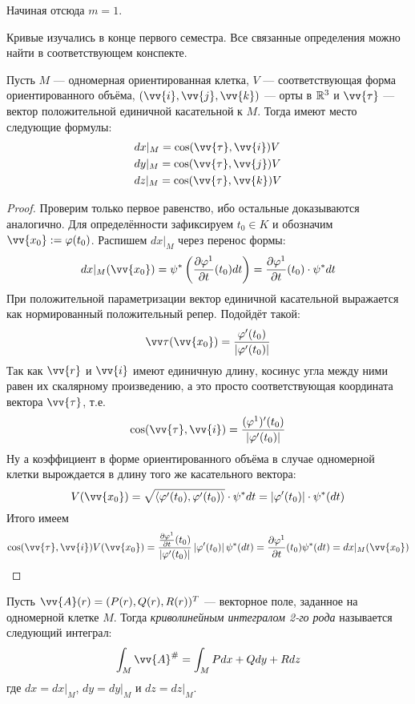\begin{note}
	Начиная отсюда $m = 1$.
\end{note}

\begin{reminder}
	Кривые изучались в конце первого семестра. Все связанные определения можно найти в соответствующем конспекте.
\end{reminder}

\begin{proposition}
	Пусть $M$ --- одномерная ориентированная клетка, $V$ --- соответствующая форма ориентированного объёма, $(\vv{i}, \vv{j}, \vv{k})$ --- орты в $\mathbb{R}^3$ и $\vv{\tau}$ --- вектор положительной единичной касательной к $M$. Тогда имеют место следующие формулы:
	\begin{align*}
		&{dx|_M = \cos(\vv{\tau}, \vv{i})V}
		\\
		&{dy|_M = \cos(\vv{\tau}, \vv{j})V}
		\\
		&{dz|_M = \cos(\vv{\tau}, \vv{k})V}
	\end{align*}
\end{proposition}

\begin{proof}
	Проверим только первое равенство, ибо остальные доказываются аналогично. Для определённости зафиксируем $t_0 \in K$ и обозначим $\vv{x_0} := \phi(t_0)$. Распишем $dx|_M$ через перенос формы:
	\[
		dx|_M(\vv{x_0}) = \psi^* \ps{\pd{\phi^1}{t}(t_0)dt} = \pd{\phi^1}{t}(t_0) \cdot \psi^*dt
	\]
	При положительной параметризации вектор единичной касательной выражается как нормированный положительный репер. Подойдёт такой:
	\[
		\vv\tau(\vv{x_0}) = \frac{\phi'(t_0)}{\md{\phi'(t_0)}}
	\]
	Так как $\vv{r}$ и $\vv{i}$ имеют единичную длину, косинус угла между ними равен их скалярному произведению, а это просто соответствующая координата вектора $\vv{\tau}$, т.е.
	\[
		\cos(\vv{\tau}, \vv{i}) = \frac{(\phi^1)'(t_0)}{\md{\phi'(t_0)}}
	\]
	Ну а коэффициент в форме ориентированного объёма в случае одномерной клетки вырождается в длину того же касательного вектора:
	\[
		V(\vv{x_0}) = \sqrt{\tbr{\phi'(t_0), \phi'(t_0)}} \cdot \psi^*dt = \md{\phi'(t_0)} \cdot \psi^*(dt)
	\]
	Итого имеем
	\[
		\cos(\vv{\tau}, \vv{i})V(\vv{x_0}) = \frac{\pd{\phi^1}{t}(t_0)}{\md{\phi'(t_0)}} \md{\phi'(t_0)} \psi^*(dt) = \pd{\phi^1}{t}(t_0) \psi^*(dt) = dx|_M(\vv{x_0})
	\]
\end{proof}

\begin{definition}
	Пусть $\vv{A}(r) = (P(r), Q(r), R(r))^T$ --- векторное поле, заданное на одномерной клетке $M$. Тогда \textit{криволинейным интегралом 2-го рода} называется следующий интеграл:
	\[
		\int_M \vv{A}^\# = \int_M Pdx + Qdy + Rdz
	\]
	где $dx = dx|_M$, $dy = dy|_M$ и $dz = dz|_M$.
\end{definition}


